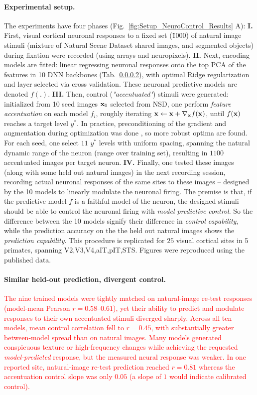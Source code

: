 \documentclass{article}
\newcommand{\red}[1]{\textcolor{red}{#1}}
\theoremstyle{plain}
\theoremstyle{definition}
\theoremstyle{remark}
\begin{document}
\paragraph{Experimental setup.}
The experiments have four phases (Fig.~\ref{fig:Setup_NeuroControl_Results} A): 
\textbf{I.} First, visual cortical neuronal responses to a fixed set (\~1000) of natural image stimuli (mixture of Natural Scene Dataset shared images, and segmented objects) during fixation were recorded (using arrays and neuropixels). 
\textbf{II.} Next, encoding models are fitted: linear regressing neuronal responses onto the top PCA of the features in 10 DNN backbones (Tab.~\ref{}), with optimal Ridge regularization and layer selected via cross validation. These neuronal predictive models are denoted $f(.)$. 
\textbf{III.} Then, control (\textit{"accentuated"}) stimuli were generated: initialized from 10 seed images $\mathbf{x}_0$ selected from NSD, one perform \textit{feature accentuation} on each model $f_i$, roughly iterating $\mathbf{x}\gets \mathbf{x} +\nabla_{\mathbf{x}}f(\mathbf{x})$, until $f(\mathbf{x})$ reaches a target level $y^*$. In practice, preconditioning of the gradient and augmentation during optimization was done \citep{hamblin2024feature}, so more robust optima are found. For each seed, one select $11$ $y^*$ levels with uniform spacing, spanning the natural dynamic range of the neuron (range over training set), resulting in $1100$ accentuated images per target neuron. 
\textbf{IV.} Finally, one tested these images (along with some held out natural images) in the next recording session, 
recording actual neuronal responses of the same sites to these images -- designed by the 10 models to linearly modulate the neuronal firing. 
The premise is that, if the predictive model $f$ is a faithful model of the neuron, the designed stimuli should be able to control the neuronal firing with \textit{model predictive control}. So the difference between the 10 models signify their difference in \textit{control capability}, while the prediction accuracy on the the held out natural images shows the \textit{prediction capability}. 
This procedure is replicated for $25$ visual cortical sites in 5 primates, spanning V2,V3,V4,aIT,pIT,STS. Figures were reproduced using the published data. 


\paragraph{Similar held-out prediction, divergent control.}
\red{The nine trained models were tightly matched on natural-image re-test responses (model-mean Pearson $r=0.58$--$0.61$), yet their ability to predict and modulate responses to their own accentuated stimuli diverged sharply. Across all ten models, mean control correlation fell to $r=0.45$, with substantially greater between-model spread than on natural images. Many models generated conspicuous texture or high-frequency changes while achieving the requested \emph{model-predicted} response, but the measured neural response was weaker. In one reported site, natural-image re-test prediction reached $r=0.81$ whereas the accentuation control slope was only $0.05$ (a slope of $1$ would indicate calibrated control).}
\end{document}
